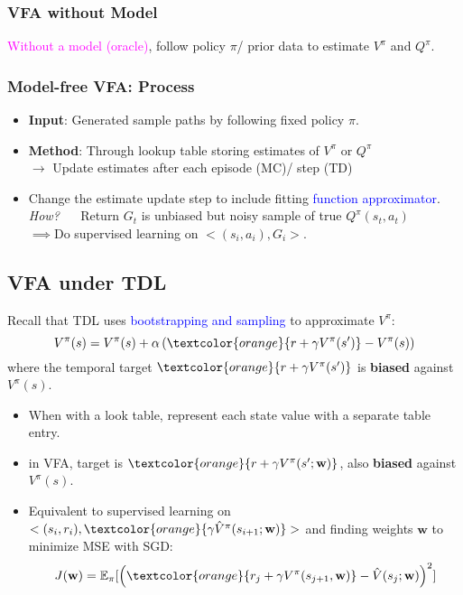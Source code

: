 \documentclass{article}
\begin{document}
\subsubsection{VFA without Model}
\textcolor{magenta}{Without a model (oracle)}, follow policy $\pi$/ prior data to estimate $V^{\pi}$ and $Q^{\pi}$.
\begin{defbox}
    \subsubsection*{Model-free VFA: Process}
    \begin{itemize}
    \item \textbf{Input}: Generated sample paths by following fixed policy $\pi$.
    \item \textbf{Method}: Through lookup table storing estimates of $V^{\pi}$ or $Q^{\pi}$
        \\$\to$ Update estimates after each episode (MC)/ step (TD)
    \item Change the estimate update step to include fitting \textcolor{blue}{function approximator}.
        \\\textit{How?} ~~ Return $G_t$ is unbiased but noisy sample of true $Q^{\pi}(s_t, a_t)$
        \\$\implies$Do supervised learning on $<(s_i, a_i), G_i>$.
    \end{itemize}
\end{defbox}

\subsection{VFA under TDL}
Recall that TDL uses \textcolor{blue}{bootstrapping and sampling} to approximate $V^{\pi}$:
\begin{equation*}
    V^{\pi}(s) = V^{\pi}(s) + \alpha \left( \textcolor{orange}{r + \gamma V^{\pi}(s')} - V^{\pi}(s) \right)
\end{equation*}
where the temporal target $\textcolor{orange}{r + \gamma V^{\pi}(s')}$ is \textbf{biased} against $V^{\pi}(s)$.
\begin{itemize}
\item When with a look table, represent each state value with a separate table entry.
\item in VFA, target is $\textcolor{orange}{r + \gamma V^{\pi}(s' ; \mathbf{w})}$, also \textbf{biased} against $V^{\pi}(s)$.
\item Equivalent to supervised learning on $<(s_i, r_i), \textcolor{orange}{\gamma \hat{V}^{\pi} (s_{i+1}; \mathbf{w})}>$ and finding weights $\mathbf{w}$ to minimize MSE with SGD:
\begin{equation*}
    J(\mathbf{w}) = \mathbb{E}_{\pi}[ \left( \textcolor{orange}{r_j + \gamma V^{\pi} (s_{j+1}, \mathbf{w})} - \hat{V}(s_j; \mathbf{w}) \right)^2]
\end{equation*}
\end{itemize}
\end{document}
